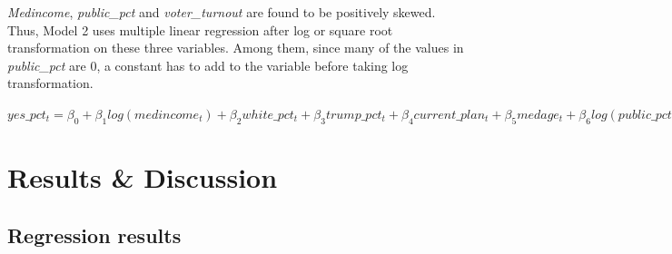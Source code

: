 \documentclass[
]{article}
\begin{document}
\emph{Medincome}, \emph{public\_pct} and \emph{voter\_turnout} are found
to be positively skewed. Thus, Model 2 uses multiple linear regression
after log or square root transformation on these three variables. Among
them, since many of the values in \emph{public\_pct} are 0, a constant
has to add to the variable before taking log transformation.

\(yes\_pct_t = \beta_0+\beta_1log(medincome_t)+\beta_2white\_pct_t+\beta_3trump\_pct_t+\beta_4current\_plan_t+\beta_5medage_t+\beta_6log(public\_pct_t + 0.01)+\beta_7time\_pct_t+\beta_8\sqrt{voter\_turnout_t}+\epsilon_t\)

\hypertarget{results-discussion}{%
\section{Results \& Discussion}\label{results-discussion}}

\hypertarget{regression-results}{%
\subsection{Regression results}\label{regression-results}}
\end{document}
